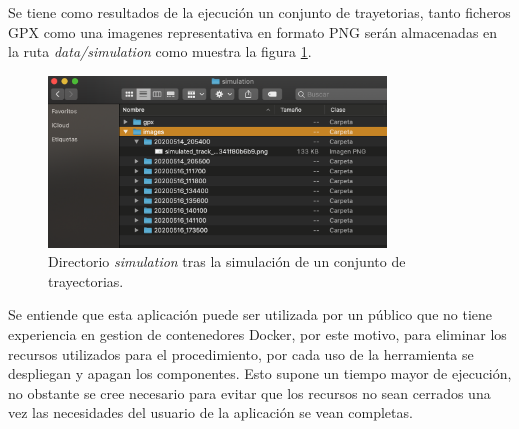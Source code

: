 Se tiene como resultados de la ejecución un conjunto de trayetorias, tanto ficheros \ac{GPX} como una imagenes representativa en formato \ac{PNG} serán almacenadas en la ruta \textit{data\slash simulation} como muestra la figura \ref{figure:SimulationFolder}.
\begin{figure}[!htb]
\begin{center}
\includegraphics[width=0.8\textwidth]{./Imagenes/SimulationFolderResults.png}
\caption{Directorio \textit{simulation} tras la simulación de un conjunto de trayectorias.}
\label{figure:SimulationFolder}
\end{center}
\end{figure}
\newpage

Se entiende que esta aplicación puede ser utilizada por un público que no tiene experiencia en gestion de contenedores Docker, por este motivo, para eliminar los recursos utilizados para el procedimiento, por cada uso de la herramienta se despliegan y apagan los componentes. Esto supone un tiempo mayor de ejecución, no obstante se cree necesario para evitar que los recursos no sean cerrados una vez las necesidades del usuario de la aplicación se vean completas.